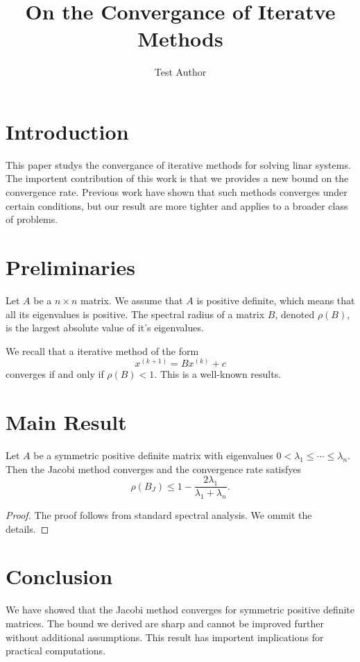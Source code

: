 \documentclass{article}
\title{On the Convergance of Iteratve Methods}
\author{Test Author}
\date{}
\begin{document}
\maketitle

\section{Introduction}
This paper studys the convergance of iterative methods for solving linar systems.
The importent contribution of this work is that we provides a new bound on the convergence rate.
Previous work have shown that such methods converges under certain conditions,
but our result are more tighter and applies to a broader class of problems.

\section{Preliminaries}
Let $A$ be a $n \times n$ matrix. We assume that $A$ is positive definite,
which means that all its eigenvalues is positive.
The spectral radius of a matrix $B$, denoted $\rho(B)$, is the largest absolute value of it's eigenvalues.

We recall that a iterative method of the form
\[
x^{(k+1)} = Bx^{(k)} + c
\]
converges if and only if $\rho(B) < 1$. This is a well-known results.

\section{Main Result}
\begin{theorem}
Let $A$ be a symmetric positive definite matrix with eigenvalues $0 < \lambda_1 \le \cdots \le \lambda_n$.
Then the Jacobi method converges and the convergence rate satisfyes
\[
\rho(B_J) \le 1 - \frac{2\lambda_1}{\lambda_1 + \lambda_n}.
\]
\end{theorem}

\begin{proof}
The proof follows from standard spectral analysis. We ommit the details.
\end{proof}

\section{Conclusion}
We have showed that the Jacobi method converges for symmetric positive definite matrices.
The bound we derived are sharp and cannot be improved further without additional assumptions.
This result has importent implications for practical computations.
\end{document}
